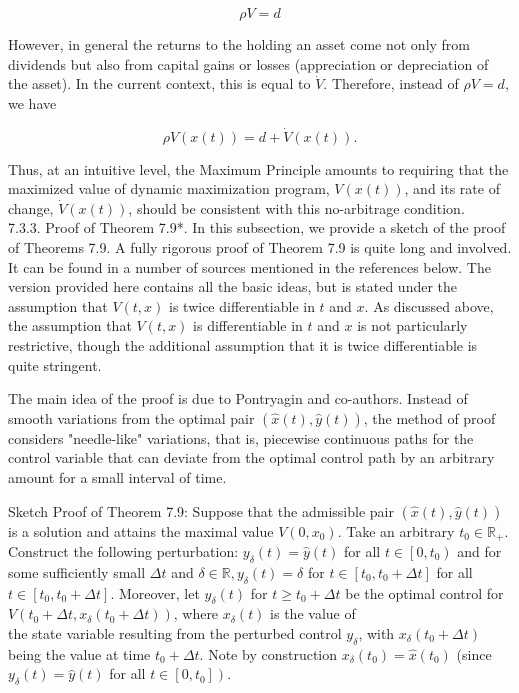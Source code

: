 \documentclass[\topdir/lecture_notes.tex]{subfiles}
\begin{document}
\[
\rho V=d
\]

However, in general the returns to the holding an asset come not only from dividends but also from capital gains or losses (appreciation or depreciation of the asset). In the current context, this is equal to $\dot{V}$. Therefore, instead of $\rho V=d$, we have

\[
\rho V(x(t))=d+\dot{V}(x(t)) .
\]

Thus, at an intuitive level, the Maximum Principle amounts to requiring that the maximized value of dynamic maximization program, $V(x(t))$, and its rate of change, $\dot{V}(x(t))$, should be consistent with this no-arbitrage condition.\\
7.3.3. Proof of Theorem 7.9*. In this subsection, we provide a sketch of the proof of Theorems 7.9. A fully rigorous proof of Theorem 7.9 is quite long and involved. It can be found in a number of sources mentioned in the references below. The version provided here contains all the basic ideas, but is stated under the assumption that $V(t, x)$ is twice differentiable in $t$ and $x$. As discussed above, the assumption that $V(t, x)$ is differentiable in $t$ and $x$ is not particularly restrictive, though the additional assumption that it is twice differentiable is quite stringent.

The main idea of the proof is due to Pontryagin and co-authors. Instead of smooth variations from the optimal pair $(\hat{x}(t), \hat{y}(t))$, the method of proof considers "needle-like" variations, that is, piecewise continuous paths for the control variable that can deviate from the optimal control path by an arbitrary amount for a small interval of time.

Sketch Proof of Theorem 7.9: Suppose that the admissible pair $(\hat{x}(t), \hat{y}(t))$ is a solution and attains the maximal value $V\left(0, x_{0}\right)$. Take an arbitrary $t_{0} \in \mathbb{R}_{+}$. Construct the following perturbation: $y_{\delta}(t)=\hat{y}(t)$ for all $t \in\left[0, t_{0}\right)$ and for some sufficiently small $\Delta t$ and $\delta \in \mathbb{R}, y_{\delta}(t)=\delta$ for $t \in\left[t_{0}, t_{0}+\Delta t\right]$ for all $t \in\left[t_{0}, t_{0}+\Delta t\right]$. Moreover, let $y_{\delta}(t)$ for $t \geq t_{0}+\Delta t$ be the optimal control for $V\left(t_{0}+\Delta t, x_{\delta}\left(t_{0}+\Delta t\right)\right)$, where $x_{\delta}(t)$ is the value of\\
the state variable resulting from the perturbed control $y_{\delta}$, with $x_{\delta}\left(t_{0}+\Delta t\right)$ being the value at time $t_{0}+\Delta t$. Note by construction $x_{\delta}\left(t_{0}\right)=\hat{x}\left(t_{0}\right)$ (since $y_{\delta}(t)=\hat{y}(t)$ for all $\left.t \in\left[0, t_{0}\right]\right)$.
\end{document}
